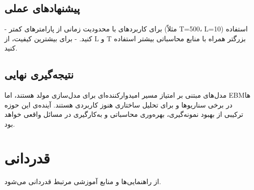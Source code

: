 \subsection{پیشنهادهای عملی}
- برای کاربردهای با محدودیت زمانی از پارامترهای کمتر (مثلاً T=500، L=10) استفاده کنید.
- برای بیشترین کیفیت، از L و T بزرگتر همراه با منابع محاسباتی بیشتر استفاده کنید.

\subsection{نتیجه‌گیری نهایی}
مدل‌های مبتنی بر امتیاز مسیر امیدوارکننده‌ای برای مدل‌سازی مولد هستند، اما EBMها در برخی سناریوها و برای تحلیل ساختاری هنوز کاربردی هستند. آینده‌ی این حوزه ترکیبی از بهبود نمونه‌گیری، بهره‌وری محاسباتی و به‌کارگیری در مسائل واقعی خواهد بود.

\section*{قدردانی}
از راهنمایی‌ها و منابع آموزشی مرتبط قدردانی می‌شود.